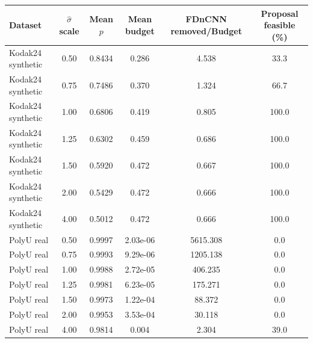 \begin{tabular}{lccccc}
\toprule
Dataset & $\hat\sigma$ scale & Mean $p$ & Mean budget & FDnCNN removed/Budget & Proposal feasible (\%) \\
\midrule
Kodak24 synthetic & 0.50 & 0.8434 & 0.286 & 4.538 & 33.3 \\
Kodak24 synthetic & 0.75 & 0.7486 & 0.370 & 1.324 & 66.7 \\
Kodak24 synthetic & 1.00 & 0.6806 & 0.419 & 0.805 & 100.0 \\
Kodak24 synthetic & 1.25 & 0.6302 & 0.459 & 0.686 & 100.0 \\
Kodak24 synthetic & 1.50 & 0.5920 & 0.472 & 0.667 & 100.0 \\
Kodak24 synthetic & 2.00 & 0.5429 & 0.472 & 0.666 & 100.0 \\
Kodak24 synthetic & 4.00 & 0.5012 & 0.472 & 0.666 & 100.0 \\
PolyU real & 0.50 & 0.9997 & 2.03e-06 & 5615.308 & 0.0 \\
PolyU real & 0.75 & 0.9993 & 9.29e-06 & 1205.138 & 0.0 \\
PolyU real & 1.00 & 0.9988 & 2.72e-05 & 406.235 & 0.0 \\
PolyU real & 1.25 & 0.9981 & 6.23e-05 & 175.271 & 0.0 \\
PolyU real & 1.50 & 0.9973 & 1.22e-04 & 88.372 & 0.0 \\
PolyU real & 2.00 & 0.9953 & 3.53e-04 & 30.118 & 0.0 \\
PolyU real & 4.00 & 0.9814 & 0.004 & 2.304 & 39.0 \\
\bottomrule
\end{tabular}
